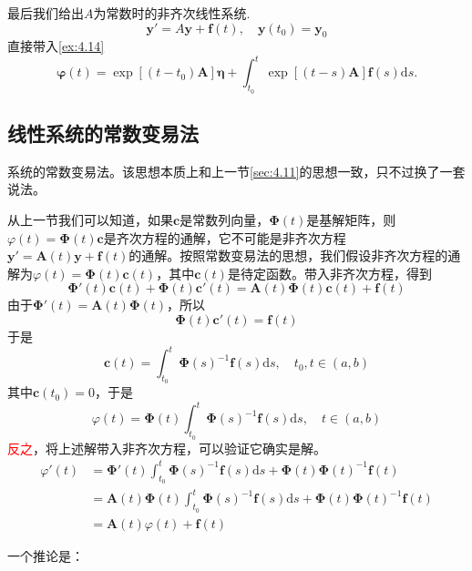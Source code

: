 最后我们给出$A$为常数时的非齐次线性系统.
\begin{equation}\label{eq:4.96}
    \mathbf{y}'=A\mathbf{y}+\mathbf{f}(t),\quad \mathbf{y}(t_0)=\mathbf{y}_0
\end{equation}
直接带入\ref{ex:4.14}
\[
    \boldsymbol{\varphi}(t)=\exp \left[\left(t-t_0\right) \boldsymbol{A}\right] \boldsymbol{\eta}+\int_{t_0}^t \exp [(t-s) \boldsymbol{A}] \boldsymbol{f}(s) \mathrm{d} s .
\]

\subsection{线性系统的常数变易法}

系统的常数变易法。该思想本质上和上一节\ref{sec:4.11}的思想一致，只不过换了一套说法。

从上一节我们可以知道，如果$\mathbf{c}$是常数列向量，$\boldsymbol{\Phi}(t)$是基解矩阵，则$\varphi(t)=\boldsymbol{\Phi}(t)\mathbf{c}$是齐次方程的通解，它不可能是非齐次方程$\mathbf{y}'=\boldsymbol{A}(t)\mathbf{y}+\mathbf{f}(t)$的通解。按照常数变易法的思想，我们假设非齐次方程的通解为$\varphi(t)=\boldsymbol{\Phi}(t)\mathbf{c}(t)$，其中$\mathbf{c}(t)$是待定函数。带入非齐次方程，得到
\[
    \boldsymbol{\Phi}'(t)\mathbf{c}(t)+\boldsymbol{\Phi}(t)\mathbf{c}'(t)=\boldsymbol{A}(t)\boldsymbol{\Phi}(t)\mathbf{c}(t)+\mathbf{f}(t)
\]
由于$\boldsymbol{\Phi}'(t)=\boldsymbol{A}(t)\boldsymbol{\Phi}(t)$，所以
\[
    \boldsymbol{\Phi}(t)\mathbf{c}'(t)=\mathbf{f}(t)
\]
于是
\[
    \mathbf{c}(t)=\int_{t_0}^t\boldsymbol{\Phi}(s)^{-1}\mathbf{f}(s)\mathrm{d}s,\quad t_0,t\in(a,b)
\]
其中$\mathbf{c}(t_0)=0$，于是
\[
    \varphi(t)=\boldsymbol{\Phi}(t)\int_{t_0}^t\boldsymbol{\Phi}(s)^{-1}\mathbf{f}(s)\mathrm{d}s,\quad t\in(a,b)
\]
\textcolor{red}{反之}，将上述解带入非齐次方程，可以验证它确实是解。
\begin{align*}
    \varphi'(t) & =\boldsymbol{\Phi}'(t)\int_{t_0}^t\boldsymbol{\Phi}(s)^{-1}\mathbf{f}(s)\mathrm{d}s+\boldsymbol{\Phi}(t)\boldsymbol{\Phi}(t)^{-1}\mathbf{f}(t)                 \\
                & =\boldsymbol{A}(t)\boldsymbol{\Phi}(t)\int_{t_0}^t\boldsymbol{\Phi}(s)^{-1}\mathbf{f}(s)\mathrm{d}s+\boldsymbol{\Phi}(t)\boldsymbol{\Phi}(t)^{-1}\mathbf{f}(t) \\
                & =\boldsymbol{A}(t)\varphi(t)+\mathbf{f}(t)
\end{align*}

一个推论是：

